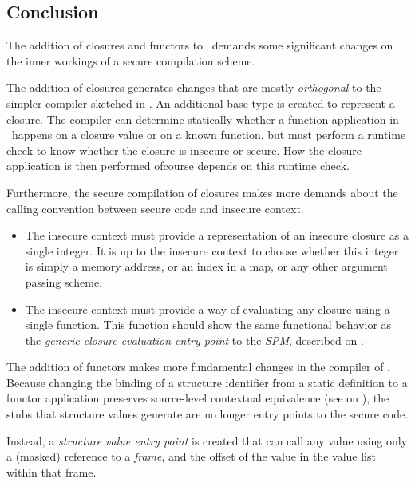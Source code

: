 \subsection{Conclusion}
The addition of closures and functors to \MiniML\ demands some significant changes on the inner workings of a secure compilation scheme.

The addition of closures generates changes that are mostly \emph{orthogonal} to the simpler compiler sketched in .
An additional base type is created to represent a closure.
The compiler can determine statically whether a function application in \MiniML\ happens on a closure value or on a known function, but must perform a runtime check to know whether the closure is insecure or secure.
How the closure application is then performed ofcourse depends on this runtime check.

Furthermore, the secure compilation of closures makes more demands about the calling convention between secure code and insecure context.
\begin{itemize}
\item 
The insecure context must provide a representation of an insecure closure as a single integer.
It is up to the insecure context to choose whether this integer is simply a memory address, or an index in a map, or any other argument passing scheme.
\item The insecure context must provide a way of evaluating any closure using a single function.
This function should show the same functional behavior as the \emph{generic closure evaluation entry point} to the \emph{SPM}, described on .
\end{itemize}

The addition of functors makes more fundamental changes in the compiler of .
Because changing the binding of a structure identifier from a static definition to a functor application preserves source-level contextual equivalence (see  on ), the stubs that structure values generate are no longer entry points to the secure code.

Instead, a \emph{structure value entry point} is created that can call any value using only a (masked) reference to a \emph{frame}, and the offset of the value in the value list within that frame.